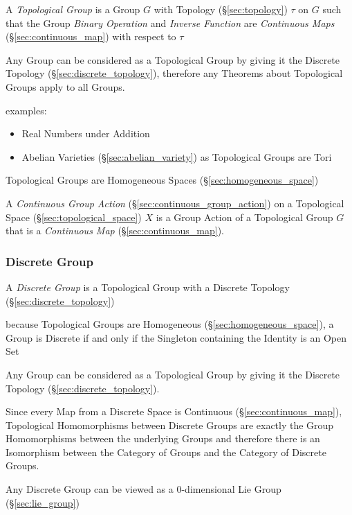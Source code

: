 A \emph{Topological Group} is a Group $G$ with Topology (\S\ref{sec:topology})
$\tau$ on $G$ such that the Group \emph{Binary Operation} and \emph{Inverse
  Function} are \emph{Continuous Maps} (\S\ref{sec:continuous_map})
with respect to $\tau$

Any Group can be considered as a Topological Group by giving it the Discrete
Topology (\S\ref{sec:discrete_topology}), therefore any Theorems about
Topological Groups apply to all Groups.

examples:
\begin{itemize}
  \item Real Numbers under Addition
  \item Abelian Varieties (\S\ref{sec:abelian_variety}) as Topological Groups
    are Tori %
\end{itemize}

Topological Groups are Homogeneous Spaces (\S\ref{sec:homogeneous_space})

A \emph{Continuous Group Action} (\S\ref{sec:continuous_group_action}) on a
Topological Space (\S\ref{sec:topological_space}) $X$ is a Group Action of a
Topological Group $G$ that is a \emph{Continuous Map}
(\S\ref{sec:continuous_map}).



\subsubsection{Discrete Group}\label{sec:discrete_group}

A \emph{Discrete Group} is a Topological Group with a Discrete Topology
(\S\ref{sec:discrete_topology})

because Topological Groups are Homogeneous (\S\ref{sec:homogeneous_space}), a
Group is Discrete if and only if the Singleton containing the Identity is an
Open Set

Any Group can be considered as a Topological Group by giving it the Discrete
Topology (\S\ref{sec:discrete_topology}).

Since every Map from a Discrete Space is Continuous
(\S\ref{sec:continuous_map}), Topological Homomorphisms between Discrete Groups
are exactly the Group Homomorphisms between the underlying Groups and therefore
there is an Isomorphism between the Category of Groups and the Category of
Discrete Groups.

Any Discrete Group can be viewed as a $0$-dimensional Lie Group
(\S\ref{sec:lie_group}) %

